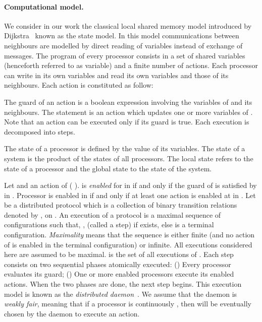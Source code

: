 \documentclass{llncs}
\begin{document}
\paragraph{\textbf{Computational model}.}
We consider in our work the classical local shared memory model introduced by Dijkstra~\cite{D74} known as the state model. In this model communications between neighbours are modelled by direct reading of variables instead of exchange of messages. The program of every processor consists in a set of shared variables (henceforth referred to as variable) and a finite number of actions. Each processor can write in its own variables and read its own variables and those of its neighbours. Each action is constituted as follow:

\begin{center}    \end{center}

The guard of an action is a boolean expression involving the variables of  and its neighbours. The statement is an action which updates one or more variables of . Note that an action can be executed only if its guard is true. Each execution is decomposed into steps. 

The state of a processor is defined by the value of its variables. The state of a system is the product of the states of all processors. The local state refers to the state of a processor and the global state to the state of the system.  

Let    and  an action of  (  ).  is {\em enabled} for  in  if and only if the guard of
 is satisfied by  in . Processor  is enabled in  if and only if at least one action is enabled at 
in . Let  be a distributed protocol which is a collection of binary transition relations denoted by
, on . An execution of a protocol  is a maximal sequence of configurations   such that,  ,  (called a step) if 
exists, else  is a terminal configuration. {\em Maximality} means that the sequence is either finite (and no action
of  is enabled in the terminal configuration) or infinite. All executions considered here are assumed to be
maximal.  is the set of all executions of . 
Each step consists on two sequential phases atomically executed:
() Every processor evaluates its guard;
() One or more enabled processors execute its enabled actions. 
When the two phases are done, the next step begins. 
This execution model is known as the \emph{distributed daemon}~\cite{BGM89}. 
We assume that the daemon is \emph{weakly fair}, meaning that if a processor  is continuously , 
then  will be eventually chosen by the daemon to execute an action.
\end{document}
